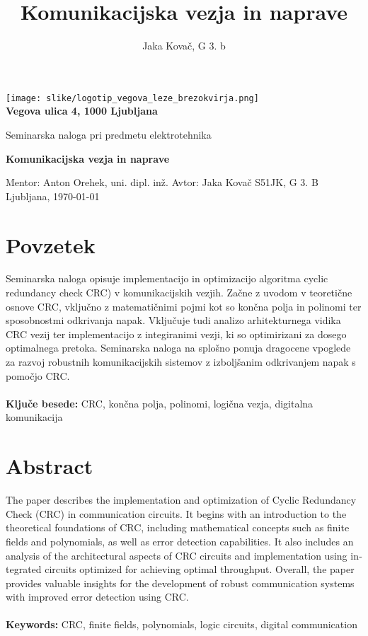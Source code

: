 \documentclass[12pt]{article}
\title{Komunikacijska vezja in naprave}
\author{Jaka Kovač, G 3. b}
\begin{document}

\begin{center}
    \thispagestyle{empty}
    \texttt{[image: slike/logotip\_vegova\_leze\_brezokvirja.png]}
    \\
    \textbf{Vegova ulica 4, 1000 Ljubljana}

    \vspace{\fill}
    Seminarska naloga pri predmetu elektrotehnika

    \Huge{\textbf{Komunikacijska vezja in naprave}}

    \normalsize
    \vspace{\fill}

    Mentor: Anton Orehek, uni. dipl. inž. \hfill Avtor: Jaka Kovač S51JK,
    G 3. B\\
    \null
    Ljubljana, \MMYYYYdate\today
\end{center}
\newpage

\section*{Povzetek}
Seminarska naloga opisuje implementacijo in optimizacijo algoritma cyclic redundancy
check CRC) v komunikacijskih vezjih. Začne z uvodom v teoretične osnove CRC, vključno z
matematičnimi pojmi kot so končna polja in polinomi ter sposobnostmi odkrivanja napak.
Vključuje tudi analizo arhitekturnega vidika CRC vezij ter implementacijo z integiranimi
vezji, ki so optimirizani za dosego optimalnega pretoka. Seminarska naloga na splošno
ponuja dragocene vpoglede za razvoj robustnih komunikacijskih sistemov z izboljšanim
odkrivanjem napak s pomočjo CRC.
\\
\\
\textbf{Ključe besede:} CRC, končna polja, polinomi, logična vezja, digitalna
komunikacija\\

\vfill
\section*{Abstract}
\foreignlanguage{english}{The paper describes the implementation and optimization
of Cyclic Redundancy Check (CRC) in communication circuits. It begins with an
introduction to the theoretical foundations of CRC, including mathematical concepts
such as finite fields and polynomials, as well as error detection capabilities. It also
includes an analysis of the architectural aspects of CRC circuits and implementation
using integrated circuits optimized for achieving optimal throughput. Overall, the paper
provides valuable insights for the development of robust communication systems with
improved error detection using CRC.
\\
\\
\textbf{Keywords:} CRC, finite fields, polynomials, logic circuits, digital
communication}
\end{document}
